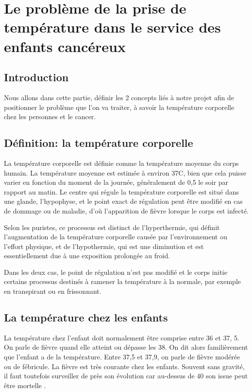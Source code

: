 \documentclass[12pt]{article}
\begin{document}
\newpage
\section{Le problème de la prise de température dans le service des enfants cancéreux}

\subsection{Introduction}
Nous allons dans cette partie, définir les 2 concepts liés à notre projet afin de positionner le problème que l’on va traiter, à savoir la température corporelle chez les personnes et le cancer.

\subsection{Définition: la température corporelle}
La température corporelle est définie comme la température moyenne du corps humain. La température moyenne est estimée à environ 37\textdegree{}C, bien que cela puisse varier en fonction du moment de la journée, généralement de 0,5 le soir par rapport au matin. Le centre qui régule la température corporelle est situé dans une glande, l'hypophyse, et le point exact de régulation peut être modifié en cas de dommage ou de maladie, d'où l'apparition de fièvre lorsque le corps est infecté. 

Selon les puristes, ce processus est distinct de l'hyperthermie, qui définit l'augmentation de la température corporelle causée par l'environnement ou l'effort physique, et de l'hypothermie, qui est une diminution et est essentiellement due à une exposition prolongée au froid. 

Dans les deux cas, le point de régulation n'est pas modifié et le corps initie certains processus destinés à ramener la température à la normale, par exemple en transpirant ou en frissonnant.

\subsection{La température chez les enfants}
La température chez l’enfant doit normalement être comprise entre 36 et 37, 5. On parle de fièvre quand elle atteint ou dépasse les 38. On dit alors familièrement que l’enfant a de la température. Entre 37,5 et 37,9, on parle de fièvre modérée ou de fébricule. La fièvre est très courante chez les enfants. Souvent sans gravité, il faut toutefois surveiller de près son évolution car au-dessus de 40 son issue peut être mortelle \cite{29}.
\end{document}
